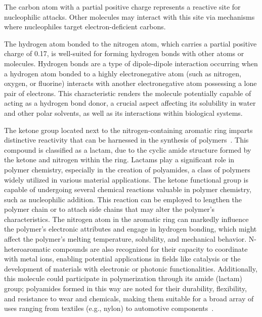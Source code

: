 The carbon atom with a partial positive charge represents a reactive site for nucleophilic attacks. Other molecules may interact with this site via mechanisms where nucleophiles target electron-deficient carbons.

The hydrogen atom bonded to the nitrogen atom, which carries a partial positive charge of 0.17, is well-suited for forming hydrogen bonds with other atoms or molecules. Hydrogen bonds are a type of dipole-dipole interaction occurring when a hydrogen atom bonded to a highly electronegative atom (such as nitrogen, oxygen, or fluorine) interacts with another electronegative atom possessing a lone pair of electrons. This characteristic renders the molecule potentially capable of acting as a hydrogen bond donor, a crucial aspect affecting its solubility in water and other polar solvents, as well as its interactions within biological systems.

The ketone group located next to the nitrogen-containing aromatic ring imparts distinctive reactivity that can be harnessed in the synthesis of polymers~\cite{McQuarrieSimonPhysicalChemistry,CareySundbergAdvancedOrganicChemistry,Varghese2022BeyondApplications,Varghese2022BeyondApplications}. This compound is classified as a lactam, due to the cyclic amide structure formed by the ketone and nitrogen within the ring. Lactams play a significant role in polymer chemistry, especially in the creation of polyamides, a class of polymers widely utilized in various material applications. The ketone functional group is capable of undergoing several chemical reactions valuable in polymer chemistry, such as nucleophilic addition. This reaction can be employed to lengthen the polymer chain or to attach side chains that may alter the polymer’s characteristics. The nitrogen atom in the aromatic ring can markedly influence the polymer’s electronic attributes and engage in hydrogen bonding, which might affect the polymer’s melting temperature, solubility, and mechanical behavior. N-heteroaromatic compounds are also recognized for their capacity to coordinate with metal ions, enabling potential applications in fields like catalysis or the development of materials with electronic or photonic functionalities. Additionally, this molecule could participate in polymerization through its amide (lactam) group; polyamides formed in this way are noted for their durability, flexibility, and resistance to wear and chemicals, making them suitable for a broad array of uses ranging from textiles (e.g., nylon) to automotive components~\cite{Varghese2022BeyondApplications,Varghese2022BeyondApplications}.

